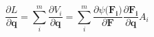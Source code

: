 \begin{equation}
   \frac{\partial L}{\partial \mathbf{q}} = \sum_i^m \frac{\partial V_i}{\partial \mathbf{q}} = \sum_i^m \frac{\partial \psi(\mathbf{F_i)}}{\partial \mathbf{F}}\frac{\partial \mathbf{F_i}}{\partial \mathbf{q}}A_i
\end{equation}
\





